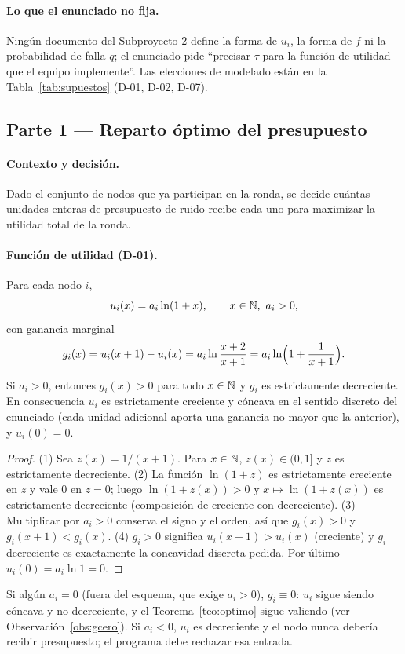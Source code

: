 \paragraph{Lo que el enunciado no fija.} Ningún documento del Subproyecto 2 define la forma de $u_i$, la forma de $f$ ni la probabilidad de falla $q$; el enunciado pide ``precisar $\tau$ para la función de utilidad que el equipo implemente''. Las elecciones de modelado están en la Tabla~\ref{tab:supuestos} (D-01, D-02, D-07).

\subsection{Parte 1 — Reparto óptimo del presupuesto}\label{sec:p1}

\paragraph{Contexto y decisión.} Dado el conjunto de nodos que ya participan en la ronda, se decide cuántas unidades enteras de presupuesto de ruido recibe cada uno para maximizar la utilidad total de la ronda.

\paragraph{Función de utilidad (D-01).} Para cada nodo $i$,
\[
u_i(x)=a_i\ln(1+x),\qquad x\in\Nat,\ a_i>0,
\]
con ganancia marginal
\[
g_i(x)=u_i(x+1)-u_i(x)=a_i\ln\frac{x+2}{x+1}=a_i\ln\Bigl(1+\frac{1}{x+1}\Bigr).
\]

\begin{lema}\label{lem:concava}
Si $a_i>0$, entonces $g_i(x)>0$ para todo $x\in\mathbb{N}$ y $g_i$ es estrictamente decreciente. En consecuencia $u_i$ es estrictamente creciente y cóncava en el sentido discreto del enunciado (cada unidad adicional aporta una ganancia no mayor que la anterior), y $u_i(0)=0$.
\end{lema}
\begin{proof}
(1) Sea $z(x)=1/(x+1)$. Para $x\in\mathbb{N}$, $z(x)\in(0,1]$ y $z$ es estrictamente decreciente.
(2) La función $\ln(1+z)$ es estrictamente creciente en $z$ y vale $0$ en $z=0$; luego $\ln(1+z(x))>0$ y $x\mapsto \ln(1+z(x))$ es estrictamente decreciente (composición de creciente con decreciente).
(3) Multiplicar por $a_i>0$ conserva el signo y el orden, así que $g_i(x)>0$ y $g_i(x+1)<g_i(x)$.
(4) $g_i>0$ significa $u_i(x+1)>u_i(x)$ (creciente) y $g_i$ decreciente es exactamente la concavidad discreta pedida. Por último $u_i(0)=a_i\ln 1=0$.
\end{proof}
\begin{observacion}
Si algún $a_i=0$ (fuera del esquema, que exige $a_i>0$), $g_i\equiv 0$: $u_i$ sigue siendo cóncava y no decreciente, y el Teorema~\ref{teo:optimo} sigue valiendo (ver Observación~\ref{obs:gcero}). Si $a_i<0$, $u_i$ es decreciente y el nodo nunca debería recibir presupuesto; el programa debe rechazar esa entrada.
\end{observacion}

